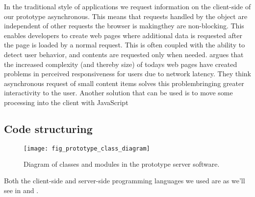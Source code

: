 In the traditional style of  applications we request information on
the client-side of our prototype asynchronous.%
This means that requests handled by the  object
are independent of other requests the browser is making\dash{}they
are non-blocking. This enables developers to create web pages where additional
data is requested after the page is loaded by a normal  request.
This is often coupled with the ability to detect user behavior, and contents
are requested only when needed. \citet[pp.281--282]{stamey06} argues that
the increased complexity (and thereby size) of todays web pages have created
problems in perceived responsiveness for users due to network latency. They
think asynchronous request of small content items solves this
problem\dash{}bringing greater interactivity to the user. Another solution
that can be used is to move some processing into the client with
JavaScript \citep[]{jazayeri07}

\subsection{Code structuring}
\label{section:implementation.architecture.code.structuring}

\begin{figure}
  \begin{whole}
    \texttt{[image: fig\_prototype\_class\_diagram]}
    \caption[Prototype Class Diagram]{
      Diagram of classes and modules in the prototype server software.
    }
    \label{figure:fig.prototype.class.diagram}
  \end{whole}
\end{figure}

Both the client-side and server-side programming languages we used
are as we'll see in
 and
 .%

